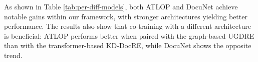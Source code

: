 As shown in Table \ref{tab:per-diff-models}, both ATLOP and DocuNet achieve notable gains within our framework, with stronger architectures yielding better performance. The results also show that co-training with a different architecture is beneficial: ATLOP performs better when paired with the graph-based UGDRE than with the transformer-based KD-DocRE, while DocuNet shows the opposite trend.






